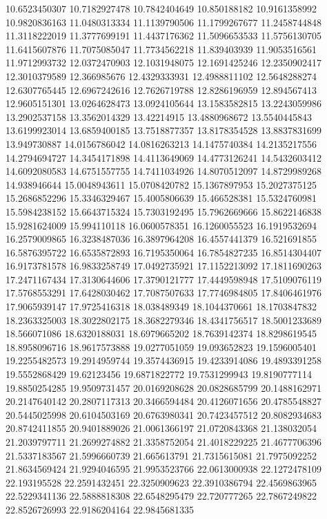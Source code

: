 \documentclass[draft=on]{scrbook}
\begin{document}
\begin{minipage}{.5\textwidth}
10.6523450307
10.7182927478
10.7842404649
10.850188182
10.9161358992
10.9820836163
11.0480313334
11.1139790506
11.1799267677
11.2458744848
11.3118222019
11.3777699191
11.4437176362
11.5096653533
11.5756130705
11.6415607876
11.7075085047
11.7734562218
11.839403939
11.9053516561
11.9712993732
12.0372470903
12.1031948075
12.1691425246
12.2350902417
12.3010379589
12.366985676
12.4329333931
12.4988811102
12.5648288274
12.6307765445
12.6967242616
12.7626719788
12.8286196959
12.894567413
12.9605151301
13.0264628473
13.0924105644
13.1583582815
13.2243059986
13.2902537158
13.3562014329
13.42214915
13.4880968672
13.5540445843
13.6199923014
13.6859400185
13.7518877357
13.8178354528
13.8837831699
13.949730887
14.0156786042
14.0816263213
14.1475740384
14.2135217556
14.2794694727
14.3454171898
14.4113649069
14.4773126241
14.5432603412
14.6092080583
14.6751557755
14.7411034926
14.8070512097
14.8729989268
14.938946644
15.0048943611
15.0708420782
15.1367897953
15.2027375125
15.2686852296
15.3346329467
15.4005806639
15.466528381
15.5324760981
15.5984238152
15.6643715324
15.7303192495
15.7962669666
15.8622146838
15.9281624009
15.994110118
16.0600578351
16.1260055523
16.1919532694
16.2579009865
16.3238487036
16.3897964208
16.4557441379
16.521691855
16.5876395722
16.6535872893
16.7195350064
16.7854827235
16.8514304407
16.9173781578
16.9833258749
17.0492735921
17.1152213092
17.1811690263
17.2471167434
17.3130644606
17.3790121777
17.4449598948
17.5109076119
17.5768553291
17.6428030462
17.7087507633
17.7746984805
17.8406461976
17.9065939147
17.9725416318
18.038489349
18.1044370661
18.1703847832
18.2363325003
18.3022802175
18.3682279346
18.4341756517
18.5001233689
18.566071086
18.6320188031
18.6979665202
18.7639142374
18.8298619545
18.8958096716
18.9617573888
19.0277051059
19.093652823
19.1596005401
19.2255482573
19.2914959744
19.3574436915
19.4233914086
19.4893391258
19.5552868429
19.62123456
19.6871822772
19.7531299943
19.8190777114
19.8850254285
19.9509731457
20.0169208628
20.0828685799
20.1488162971
20.2147640142
20.2807117313
20.3466594484
20.4126071656
20.4785548827
20.5445025998
20.6104503169
20.6763980341
20.7423457512
20.8082934683
20.8742411855
20.9401889026
21.0061366197
21.0720843368
21.138032054
21.2039797711
21.2699274882
21.3358752054
21.4018229225
21.4677706396
21.5337183567
21.5996660739
21.665613791
21.7315615081
21.7975092252
21.8634569424
21.9294046595
21.9953523766
22.0613000938
22.1272478109
22.193195528
22.2591432451
22.3250909623
22.3910386794
22.4569863965
22.5229341136
22.5888818308
22.6548295479
22.720777265
22.7867249822
22.8526726993
22.9186204164
22.9845681335

\end{minipage}
\end{document}
